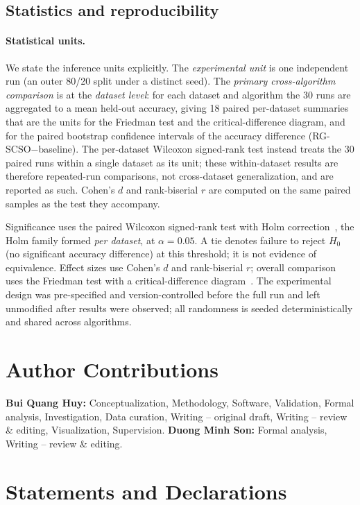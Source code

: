 \documentclass[preprint,3p,times]{elsarticle}
\begin{document}
\subsection{Statistics and reproducibility}
\paragraph{Statistical units.} We state the inference units explicitly. The
\emph{experimental unit} is one independent run (an outer 80/20 split under a
distinct seed). The \emph{primary cross-algorithm comparison} is at the
\emph{dataset level}: for each dataset and algorithm the 30 runs are
aggregated to a mean held-out accuracy, giving 18 paired per-dataset
summaries that are the units for the Friedman test and the critical-difference
diagram, and for the paired bootstrap confidence intervals of the
accuracy difference (RG-SCSO$-$baseline). The per-dataset Wilcoxon signed-rank
test instead treats the 30 paired runs within a single dataset as its unit;
these within-dataset results are therefore repeated-run comparisons, not
cross-dataset generalization, and are reported as such. Cohen's $d$ and
rank-biserial $r$ are computed on the same paired samples as the test they
accompany.

Significance uses the paired Wilcoxon signed-rank test with Holm
correction~\cite{holm}, the Holm family formed \emph{per dataset}, at
$\alpha=0.05$. A tie denotes failure to reject $H_0$ (no significant
accuracy difference) at this threshold; it is not evidence of equivalence.
Effect sizes use Cohen's $d$ and rank-biserial $r$; overall comparison uses the
Friedman test with a critical-difference diagram~\cite{demsar}. The
experimental design was pre-specified and version-controlled before the full
run and left unmodified after results were observed; all randomness is
seeded deterministically and shared across algorithms.

\section*{Author Contributions}
\textbf{Bui Quang Huy:} Conceptualization, Methodology, Software,
Validation, Formal analysis, Investigation, Data curation, Writing --
original draft, Writing -- review \& editing, Visualization, Supervision.
\textbf{Duong Minh Son:} Formal analysis, Writing -- review \& editing.

\section*{Statements and Declarations}
\end{document}
